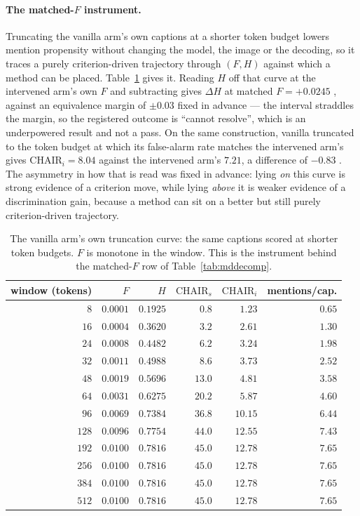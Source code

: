 \paragraph{The matched-$F$ instrument.} Truncating the vanilla arm's own captions at a shorter token
budget lowers mention propensity without changing the model, the image or the decoding, so it traces
a purely criterion-driven trajectory through $(F, H)$ against which a method can be placed.
Table~\ref{tab:mdcurve} gives it. Reading $H$ off that curve at the intervened arm's own $F$ and
subtracting gives $\Delta H$ at matched $F = +0.0245$ , against an equivalence
margin of $\pm 0.03$ fixed in advance --- the interval straddles the margin, so the registered
outcome is ``cannot resolve'', which is an underpowered result and not a pass. On the same
construction, vanilla truncated to the token budget at which its false-alarm rate matches the
intervened arm's gives $\mathrm{CHAIR}_i = 8.04$  against the intervened arm's
$7.21$, a difference of $-0.83$ . The asymmetry in how that is read was fixed in
advance: lying \emph{on} this curve is strong evidence of a criterion move, while lying
\emph{above} it is weaker evidence of a discrimination gain, because a method can sit on a better
but still purely criterion-driven trajectory.

\begin{table}[htb]
\caption{The vanilla arm's own truncation curve: the same captions scored at shorter token budgets.
$F$ is monotone in the window. This is the instrument behind the matched-$F$ row of
Table~\ref{tab:mddecomp}.}
\label{tab:mdcurve}
\begin{center}
\small
\begin{tabular}{rrrrrr}
\toprule
window (tokens) & $F$ & $H$ & $\mathrm{CHAIR}_s$ & $\mathrm{CHAIR}_i$ & mentions/cap. \\
\midrule
$8$ & $0.0001$ & $0.1925$ & $0.8$ & $1.23$ & $0.65$ \\
$16$ & $0.0004$ & $0.3620$ & $3.2$ & $2.61$ & $1.30$ \\
$24$ & $0.0008$ & $0.4482$ & $6.2$ & $3.24$ & $1.98$ \\
$32$ & $0.0011$ & $0.4988$ & $8.6$ & $3.73$ & $2.52$ \\
$48$ & $0.0019$ & $0.5696$ & $13.0$ & $4.81$ & $3.58$ \\
$64$ & $0.0031$ & $0.6275$ & $20.2$ & $5.87$ & $4.60$ \\
$96$ & $0.0069$ & $0.7384$ & $36.8$ & $10.15$ & $6.44$ \\
$128$ & $0.0096$ & $0.7754$ & $44.0$ & $12.55$ & $7.43$ \\
$192$ & $0.0100$ & $0.7816$ & $45.0$ & $12.78$ & $7.65$ \\
$256$ & $0.0100$ & $0.7816$ & $45.0$ & $12.78$ & $7.65$ \\
$384$ & $0.0100$ & $0.7816$ & $45.0$ & $12.78$ & $7.65$ \\
$512$ & $0.0100$ & $0.7816$ & $45.0$ & $12.78$ & $7.65$ \\
\bottomrule
\end{tabular}
\end{center}
\end{table}


